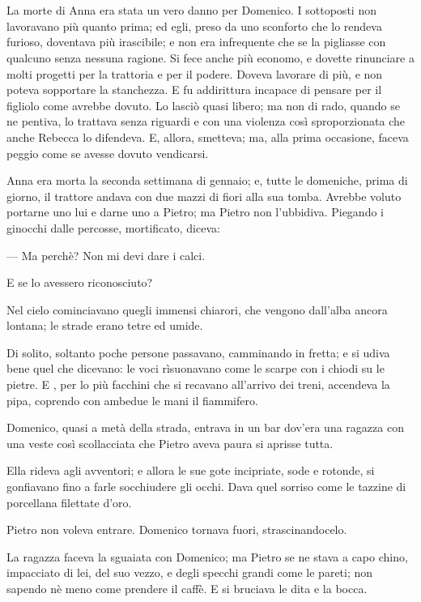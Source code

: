 \chapter{}

La morte di Anna era stata un vero danno per Domenico. I sottoposti non lavoravano più quanto prima; ed egli, preso da uno sconforto che lo rendeva furioso, doventava più irascibile; e non era infrequente che se la pigliasse con qualcuno senza nessuna ragione. Si fece anche più economo, e dovette rinunciare a molti progetti per la trattoria e per il podere. Doveva lavorare di più, e non poteva sopportare la stanchezza. E fu addirittura incapace di pensare per il figliolo come avrebbe dovuto. Lo lasciò quasi libero; ma non di rado, quando se ne pentiva, lo trattava senza riguardi e con una violenza così sproporzionata che anche Rebecca lo difendeva. E, allora, smetteva; ma, alla prima occasione, faceva peggio come se avesse dovuto vendicarsi.

Anna era morta la seconda settimana di gennaio; e, tutte le domeniche, prima di giorno, il trattore andava con due mazzi di fiori alla sua tomba. Avrebbe voluto portarne uno lui e darne uno a Pietro; ma Pietro non l'ubbidiva. Piegando i ginocchi dalle percosse, mortificato, diceva:

— Ma perchè? Non mi devi dare i calci.

E se lo avessero riconosciuto?

Nel cielo cominciavano quegli immensi chiarori, che vengono dall'alba ancora lontana; le strade erano tetre ed umide.

Di solito, soltanto poche persone passavano, camminando in fretta; e si udiva bene quel che dicevano: le voci rìsuonavano come le scarpe con i chiodi su le pietre. E , per lo più facchini che si recavano all'arrivo dei treni, accendeva la pipa, coprendo con ambedue le mani il fiammifero.

Domenico, quasi a metà della strada, entrava in un bar dov'era una ragazza con una veste così scollacciata che Pietro aveva paura si aprisse tutta.

Ella rideva agli avventori; e allora le sue gote incipriate, sode e rotonde, si gonfiavano fino a farle socchiudere gli occhi. Dava quel sorriso come le tazzine di porcellana filettate d'oro.

Pietro non voleva entrare. Domenico tornava fuori, strascinandocelo.

La ragazza faceva la sguaiata con Domenico; ma Pietro se ne stava a capo chino, impacciato di lei, del suo vezzo, e degli specchi grandi come le pareti; non sapendo nè meno come prendere il caffè. E si bruciava le dita e la bocca.


